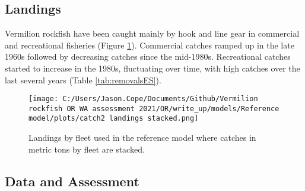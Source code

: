 \documentclass[11pt,
  english,
  a4paper,
]{article}
\begin{document}
\leavevmode\tagmcend\tagstructend\par


\hypertarget{landings}{%
\subsection*{Landings}\label{landings}}

\leavevmode\tagmcend\tagstructend


Vermilion rockfish have been caught mainly by hook and line gear in commercial and recreational fisheries (Figure \ref{fig:es-catch}). Commercial catches ramped up in the late 1960s followed by decreasing catches since the mid-1980s. Recreational catches started to increase in the 1980s, fluctuating over time, with high catches over the last several years (Table \ref{tab:removalsES}).

\leavevmode\tagmcend\tagstructend\par

\clearpage




\begin{figure}
\centering
\texttt{[image: C:/Users/Jason.Cope/Documents/Github/Vermilion rockfish OR WA assessment 2021/OR/write\_up/models/Reference model/plots/catch2 landings stacked.png]}
\caption{Landings by fleet used in the reference model where catches in metric tons by fleet are stacked.\label{fig:es-catch}}
\end{figure}

\tagmcend\tagstructend

\clearpage


\hypertarget{data-and-assessment}{%
\subsection*{Data and Assessment}\label{data-and-assessment}}

\leavevmode\tagmcend\tagstructend
\end{document}
